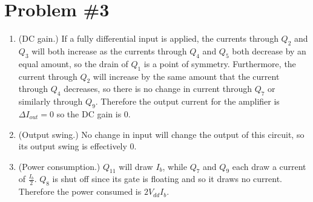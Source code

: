 \documentclass{article}
\begin{document}
\section*{Problem \#3}
\begin{enumerate}
\item{(DC gain.)
If a fully differential input is applied, the currents through $Q_2$ and
$Q_3$ will both increase as the currents through $Q_4$ and $Q_5$ both 
decrease by an equal amount, so the drain of $Q_1$ is a point of symmetry.
Furthermore, the current through $Q_2$ will increase by the same amount 
that the current through $Q_4$ decreases, so there is no change in 
current through $Q_7$ or similarly through $Q_9$. Therefore the 
output current for the amplifier is $\Delta I_{out} = 0$
so the DC gain is $0$.
}
\item{(Output swing.)
No change in input will change the output of this circuit, so its output
swing is effectively 0.
}
\item{(Power consumption.)
$Q_{11}$ will draw $I_b$, while $Q_7$ and $Q_9$ each draw a current of 
$\frac{I_b}{2}$. $Q_8$ is shut off since its gate is floating and so it
draws no current. Therefore the power consumed is $2 V_{dd} I_b$.
}
\end{enumerate}
\end{document}

